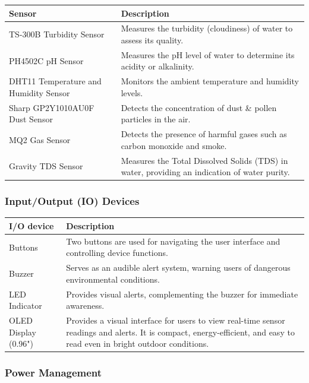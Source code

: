 \documentclass[a4paper,11pt]{article}%
\begin{document}
    \begin{tabular}{|p{}|p{}|}
    \hline
    \textbf{Sensor} & \textbf{Description} \\
    \hline
    TS-300B Turbidity Sensor & Measures the turbidity (cloudiness) of water to assess its quality. \\
    \hline
    PH4502C pH Sensor & Measures the pH level of water to determine its acidity or alkalinity. \\
    \hline
    DHT11 Temperature and Humidity Sensor & Monitors the ambient temperature and humidity levels. \\
    \hline
    Sharp GP2Y1010AU0F Dust Sensor & Detects the concentration of dust \& pollen particles in the air. \\
    \hline
    MQ2 Gas Sensor & Detects the presence of harmful gases such as carbon monoxide and smoke. \\
    \hline
    Gravity TDS Sensor & Measures the Total Dissolved Solids (TDS) in water, providing an indication of water purity. \\
    \hline
\end{tabular}



\subsubsection{Input/Output (IO) Devices}

    \begin{tabular}{|p{}|p{}|}
    \hline
    \textbf{I/O device} & \textbf{Description} \\
    \hline
    Buttons & Two buttons are used for navigating the user interface and controlling device functions. \\
    \hline
    Buzzer & Serves as an audible alert system, warning users of dangerous environmental conditions. \\
    \hline
    LED Indicator & Provides visual alerts, complementing the buzzer for immediate awareness. \\
    \hline
    OLED Display (0.96") & Provides a visual interface for users to view real-time sensor readings and alerts. It is compact, energy-efficient, and easy to read even in bright outdoor conditions. \\
    \hline
    \end{tabular}

\subsubsection{Power Management}
\end{document}

